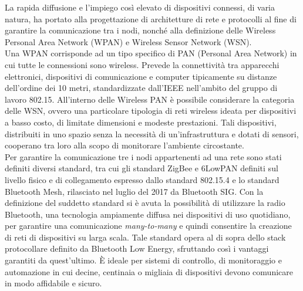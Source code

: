 \noindent La rapida diffusione e l'impiego così elevato di dispositivi connessi, di varia natura, ha portato alla progettazione di architetture di rete e protocolli al fine di garantire la comunicazione tra i nodi, nonché alla definizione delle Wireless Personal Area Network (WPAN) e Wireless Sensor Network (WSN).\\
Una WPAN corrisponde ad un tipo specifico di PAN (Personal Area Network) in cui tutte le connessioni sono wireless. Prevede la connettività tra apparecchi elettronici, dispositivi di comunicazione e computer tipicamente su distanze dell’ordine dei 10 metri, standardizzate dall’IEEE nell’ambito del gruppo di lavoro 802.15. All'interno delle Wireless PAN è possibile considerare la categoria delle WSN, ovvero una particolare tipologia di reti wireless ideata per dispositivi a basso costo, di limitate dimensioni e modeste prestazioni. Tali dispositivi, distribuiti in uno spazio senza la necessità di un'infrastruttura e dotati di sensori, cooperano tra loro alla scopo di monitorare l'ambiente circostante.\\
Per garantire la comunicazione tre i nodi appartenenti ad una rete sono stati definiti diversi standard, tra cui gli standard ZigBee e 6LowPAN definiti sul livello fisico e di collegamento espresso dallo standard 802.15.4 e lo standard Bluetooth Mesh, rilasciato nel luglio del 2017 da Bluetooth SIG. Con la definizione del suddetto standard si è avuta la possibilità di utilizzare la radio Bluetooth, una tecnologia ampiamente diffusa nei dispositivi di uso quotidiano, per garantire una comunicazione \textit{many-to-many} e quindi consentire la creazione di reti di dispositivi su larga scala.
Tale standard opera al di sopra dello stack protocollare definito da Bluetooth Low Energy, sfruttando così i vantaggi garantiti da quest'ultimo. \MakeUppercase{è} ideale per sistemi di controllo, di monitoraggio e automazione in cui decine, centinaia o migliaia di dispositivi devono comunicare in modo affidabile e sicuro.\\

